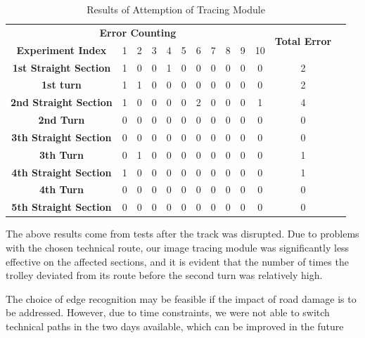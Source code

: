 \documentclass[12pt, a4paper, oneside]{report}
\begin{document}
\begin{table}[H]
    \centering
    \begin{tabular}{|c|c|c|c|c|c|c|c|c|c|c|c|c|}
    \hline
        \multicolumn{11}{|c|}{\textbf{Error Counting}} & \multirow{2}{*}{\textbf{Total Error}} \\ \cline{1-11}
        \textbf{Experiment Index} & 1 & 2 & 3 & 4 & 5 & 6 & 7 & 8 & 9 & 10 &\\ \hline
        \textbf{1st Straight Section} & 1 & 0 & 0 & 1 & 0 & 0 & 0 & 0 & 0 & 0 &2\\ \hline
        \textbf{1st turn} & 1 & 1 & 0 & 0 & 0 & 0 & 0 & 0 & 0 & 0 &2\\ \hline
        \textbf{2nd Straight Section} & 1 & 0 & 0 & 0 & 0 & 2 & 0 & 0 & 0 & 1 &4\\ \hline
        \textbf{2nd Turn} & 0 & 0 & 0 & 0 & 0 & 0 & 0 & 0 & 0 & 0 &0\\ \hline
        \textbf{3th Straight Section} & 0 & 0 & 0 & 0 & 0 & 0 & 0 & 0 & 0 & 0 &0\\ \hline
        \textbf{3th Turn} & 0 & 1 & 0 & 0 & 0 & 0 & 0 & 0 & 0 & 0 &1\\ \hline
        \textbf{4th Straight Section} & 1 & 0 & 0 & 0 & 0 & 0 & 0 & 0 & 0 & 0 &1\\ \hline
        \textbf{4th Turn} & 0 & 0 & 0 & 0 & 0 & 0 & 0 & 0 & 0 & 0 &0\\ \hline
        \textbf{5th Straight Section} & 0 & 0 & 0 & 0 & 0 & 0 & 0 & 0 & 0 & 0 &0\\ \hline
    \end{tabular}
    \caption{Results of Attemption of Tracing Module}
    \label{tab:re}
\end{table}
The above results come from tests after the track was disrupted. Due to problems with the chosen technical route, our image tracing module was significantly less effective on the affected sections, and it is evident that the number of times the trolley deviated from its route before the second turn was relatively high.

The choice of edge recognition may be feasible if the impact of road damage is to be addressed. However, due to time constraints, we were not able to switch technical paths in the two days available, which can be improved in the future
\end{document}

